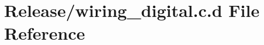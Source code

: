 \hypertarget{_release_2wiring__digital_8c_8d}{\section{\-Release/wiring\-\_\-digital.c.\-d \-File \-Reference}
\label{_release_2wiring__digital_8c_8d}
}
